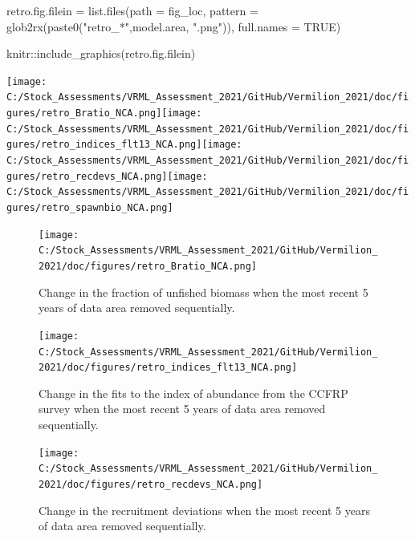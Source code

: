 \documentclass[
  english,
  a4paper,
]{article}
\newenvironment{Shaded}{\begin{snugshade}}{\end{snugshade}}
\newcommand{\AttributeTok}[1]{\textcolor[rgb]{0.77,0.63,0.00}{#1}}
\newcommand{\ConstantTok}[1]{\textcolor[rgb]{0.00,0.00,0.00}{#1}}
\newcommand{\FunctionTok}[1]{\textcolor[rgb]{0.00,0.00,0.00}{#1}}
\newcommand{\NormalTok}[1]{#1}
\newcommand{\OtherTok}[1]{\textcolor[rgb]{0.56,0.35,0.01}{#1}}
\newcommand{\SpecialCharTok}[1]{\textcolor[rgb]{0.00,0.00,0.00}{#1}}
\newcommand{\StringTok}[1]{\textcolor[rgb]{0.31,0.60,0.02}{#1}}
\begin{document}
\begin{Shaded}
\begin{Highlighting}[]
\NormalTok{retro.fig.filein }\OtherTok{=} \FunctionTok{list.files}\NormalTok{(}\AttributeTok{path =}\NormalTok{ fig\_loc,  }
                  \AttributeTok{pattern =} \FunctionTok{glob2rx}\NormalTok{(}\FunctionTok{paste0}\NormalTok{(}\StringTok{"retro\_*"}\NormalTok{,model.area, }\StringTok{".png"}\NormalTok{)), }
                  \AttributeTok{full.names =} \ConstantTok{TRUE}\NormalTok{)}

\NormalTok{knitr}\SpecialCharTok{::}\FunctionTok{include\_graphics}\NormalTok{(retro.fig.filein)}
\end{Highlighting}
\end{Shaded}

\texttt{[image: C:/Stock\_Assessments/VRML\_Assessment\_2021/GitHub/Vermilion\_2021/doc/figures/retro\_Bratio\_NCA.png]}\texttt{[image: C:/Stock\_Assessments/VRML\_Assessment\_2021/GitHub/Vermilion\_2021/doc/figures/retro\_indices\_flt13\_NCA.png]}\texttt{[image: C:/Stock\_Assessments/VRML\_Assessment\_2021/GitHub/Vermilion\_2021/doc/figures/retro\_recdevs\_NCA.png]}\texttt{[image: C:/Stock\_Assessments/VRML\_Assessment\_2021/GitHub/Vermilion\_2021/doc/figures/retro\_spawnbio\_NCA.png]}

\begin{figure}
\centering
\texttt{[image: C:/Stock\_Assessments/VRML\_Assessment\_2021/GitHub/Vermilion\_2021/doc/figures/retro\_Bratio\_NCA.png]}
\caption{Change in the fraction of unfished biomass when the most recent 5 years of data area removed sequentially.\label{fig:retro-bratio}}
\end{figure}

\begin{figure}
\centering
\texttt{[image: C:/Stock\_Assessments/VRML\_Assessment\_2021/GitHub/Vermilion\_2021/doc/figures/retro\_indices\_flt13\_NCA.png]}
\caption{Change in the fits to the index of abundance from the CCFRP survey when the most recent 5 years of data area removed sequentially.\label{fig:retro-ccfrp}}
\end{figure}

\begin{figure}
\centering
\texttt{[image: C:/Stock\_Assessments/VRML\_Assessment\_2021/GitHub/Vermilion\_2021/doc/figures/retro\_recdevs\_NCA.png]}
\caption{Change in the recruitment deviations when the most recent 5 years of data area removed sequentially.\label{fig:retro-recdev}}
\end{figure}
\end{document}

